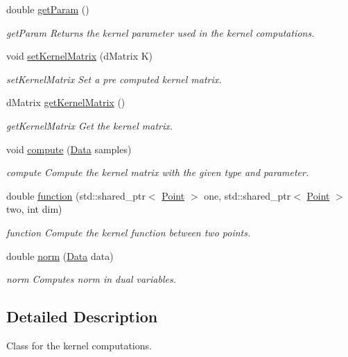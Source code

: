 \begin{DoxyCompactItemize}
double \hyperlink{class_kernel_a838e2cc5018fa702e59c52a3bf8ef813}{get\+Param} ()
\begin{DoxyCompactList}\small\item\em get\+Param Returns the kernel parameter used in the kernel computations. \end{DoxyCompactList}\item 
void \hyperlink{class_kernel_a3801cee0d86f25f1500d202f43a84b65}{set\+Kernel\+Matrix} (d\+Matrix K)
\begin{DoxyCompactList}\small\item\em set\+Kernel\+Matrix Set a pre computed kernel matrix. \end{DoxyCompactList}\item 
d\+Matrix \hyperlink{class_kernel_a5e398c63fee5f0e30b6dfb735c75e41a}{get\+Kernel\+Matrix} ()
\begin{DoxyCompactList}\small\item\em get\+Kernel\+Matrix Get the kernel matrix. \end{DoxyCompactList}\item 
void \hyperlink{class_kernel_a5dfd3a6b535745eadd9e17dc086d87c6}{compute} (\hyperlink{class_data}{Data} samples)
\begin{DoxyCompactList}\small\item\em compute Compute the kernel matrix with the given type and parameter. \end{DoxyCompactList}\item 
double \hyperlink{class_kernel_aa07703cd76124769325d942582b16b5f}{function} (std\+::shared\+\_\+ptr$<$ \hyperlink{class_point}{Point} $>$ one, std\+::shared\+\_\+ptr$<$ \hyperlink{class_point}{Point} $>$ two, int dim)
\begin{DoxyCompactList}\small\item\em function Compute the kernel function between two points. \end{DoxyCompactList}\item 
double \hyperlink{class_kernel_a1f548d2e5477ae0ee3dd3bc7f23e6920}{norm} (\hyperlink{class_data}{Data} data)
\begin{DoxyCompactList}\small\item\em norm Computes norm in dual variables. \end{DoxyCompactList}\end{DoxyCompactItemize}


\subsection{Detailed Description}
Class for the kernel computations. 

